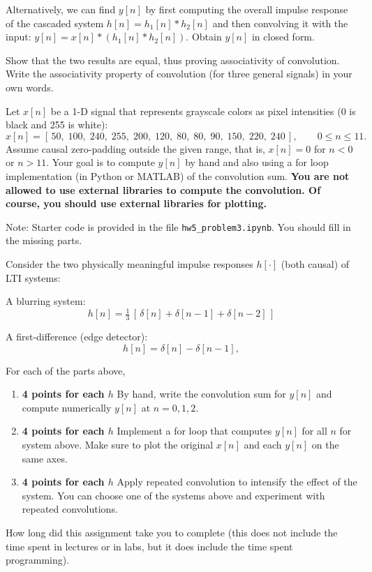\documentclass{ee102_pset}
\begin{document}
\problempart [15 points] Alternatively, we can find $y[n]$ by first computing the overall impulse response of the cascaded system $h[n] = h_1[n] * h_2[n]$ and then convolving it with the input: $y[n] = x[n] * (h_1[n] * h_2[n])$. Obtain $y[n]$ in closed form.

\problempart [5 points] Show that the two results are equal, thus proving associativity of convolution. Write the associativity property of convolution (for three general signals) in your own words.


Let $x[n]$ be a 1-D signal that represents grayscale colors as pixel intensities (0 is black and 255 is white):
\[
x[n] = [\,50,\;100,\;240,\;255,\;200,\;120,\;80,\;80,\;90,\;150,\;220,\;240\,],
\qquad 0\le n\le 11.
\]
Assume causal zero-padding outside the given range, that is, $x[n]=0$ for $n<0$ or $n>11$. Your goal is to compute $y[n]$ by hand and also using a for loop implementation (in Python or MATLAB) of the convolution sum. \textbf{You are not allowed to use external libraries to compute the convolution. Of course, you should use external libraries for plotting.}

{\color{blue} Note: Starter code is provided in the file \texttt{hw5\_problem3.ipynb}. You should fill in the missing parts.}

Consider the two physically meaningful impulse responses $h[\cdot]$ (both causal) of LTI systems:

\problempart A blurring system:
\[
h[n]=\tfrac13\,[\,\delta[n]+\delta[n-1]+\delta[n-2]\,]
\]

\problempart A first-difference (edge detector):
\[
h[n]=\delta[n]-\delta[n-1],
\]

For each of the parts above, 
\begin{enumerate}
  \item \textbf{4 points for each $h$} By hand, write the convolution sum for $y[n]$ and compute numerically $y[n]$ at $n=0,1,2$.
  \item \textbf{4 points for each $h$} Implement a for loop that computes $y[n]$ for all $n$ for system above. Make sure to plot the original $x[n]$ and each $y[n]$ on the same axes.
  \item \textbf{4 points for each $h$} Apply repeated convolution to intensify the effect of the system. You can choose one of the systems above and experiment with repeated convolutions.
\end{enumerate}

\problempart [1 point] How long did this assignment take you to complete (this does not include the time spent in lectures or in labs, but it does include the time spent programming).
\end{document}
